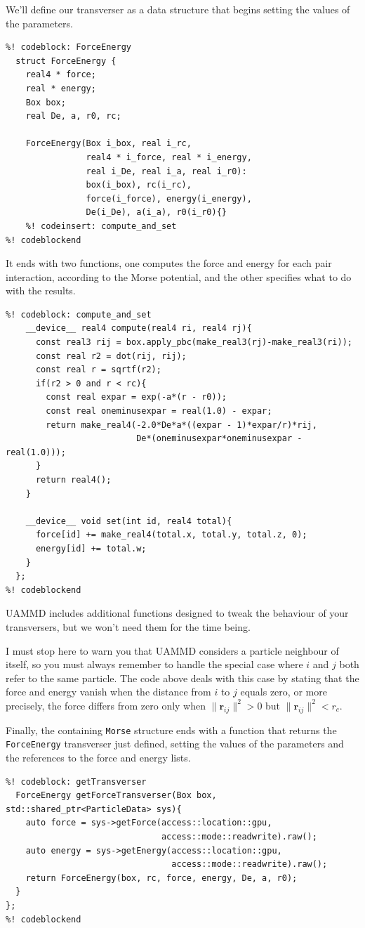 We'll define our transverser as a data structure that begins setting the values
of the parameters.
\begin{lstlisting}
%! codeblock: ForceEnergy
  struct ForceEnergy {
    real4 * force;
    real * energy;
    Box box;
    real De, a, r0, rc;

    ForceEnergy(Box i_box, real i_rc,
                real4 * i_force, real * i_energy,
                real i_De, real i_a, real i_r0):
                box(i_box), rc(i_rc),
                force(i_force), energy(i_energy),
                De(i_De), a(i_a), r0(i_r0){}
    %! codeinsert: compute_and_set
%! codeblockend
\end{lstlisting}
It ends with two functions, one computes the force and energy for each pair 
interaction, according to the Morse potential, and the other specifies what to 
do with the results.
\begin{lstlisting}
%! codeblock: compute_and_set
    __device__ real4 compute(real4 ri, real4 rj){
      const real3 rij = box.apply_pbc(make_real3(rj)-make_real3(ri));
      const real r2 = dot(rij, rij);
      const real r = sqrtf(r2);
      if(r2 > 0 and r < rc){
        const real expar = exp(-a*(r - r0));
        const real oneminusexpar = real(1.0) - expar;
        return make_real4(-2.0*De*a*((expar - 1)*expar/r)*rij,
                          De*(oneminusexpar*oneminusexpar - real(1.0)));
      }
      return real4();
    }

    __device__ void set(int id, real4 total){
      force[id] += make_real4(total.x, total.y, total.z, 0);
      energy[id] += total.w;
    }
  };
%! codeblockend
\end{lstlisting}
UAMMD includes additional functions designed to tweak the behaviour of your 
transversers, but we won't need them for the time being.

I must stop here to warn you that UAMMD considers a particle neighbour of 
itself, so you must always remember to handle the special case where $i$ and $j$ 
both refer to the same particle. The code above deals with this case by stating 
that the force and energy vanish when the distance from $i$ to $j$ equals zero, 
or more precisely, the force differs from zero only when $\|\mathbf{r}_{ij}\|^2 
> 0$ but $\|\mathbf{r}_{ij}\|^2 < r_c$.

Finally, the containing \texttt{Morse} structure ends with a function that 
returns the \texttt{ForceEnergy} transverser just defined, setting the values of 
the parameters and the references to the force and energy lists.
\begin{lstlisting}
%! codeblock: getTransverser
  ForceEnergy getForceTransverser(Box box, std::shared_ptr<ParticleData> sys){
    auto force = sys->getForce(access::location::gpu,
                               access::mode::readwrite).raw();
    auto energy = sys->getEnergy(access::location::gpu,
                                 access::mode::readwrite).raw();
    return ForceEnergy(box, rc, force, energy, De, a, r0);
  }
};
%! codeblockend
\end{lstlisting}


